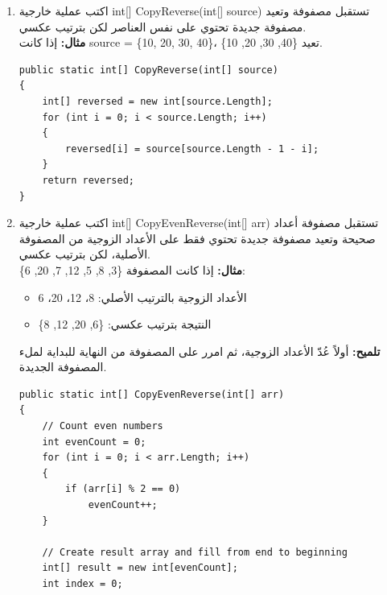 \documentclass[14pt]{extarticle}
\begin{document}
\begin{enumerate}[resume, itemsep=2em]
    \item
    اكتب عملية خارجية \textenglish{int[] CopyReverse(int[] source)} تستقبل مصفوفة وتعيد مصفوفة جديدة تحتوي على نفس العناصر لكن بترتيب عكسي.\\
    \textbf{مثال:} إذا كانت \textenglish{source = \{10, 20, 30, 40\}}، تعيد \textenglish{\{40, 30, 20, 10\}}.
    \ifwithsols
    \begin{boxSolution}
    \begin{english}
    \begin{verbatim}
public static int[] CopyReverse(int[] source)
{
    int[] reversed = new int[source.Length];
    for (int i = 0; i < source.Length; i++)
    {
        reversed[i] = source[source.Length - 1 - i];
    }
    return reversed;
}
    \end{verbatim}
    \end{english}
    \end{boxSolution}
    \fi

    \item
    اكتب عملية خارجية \textenglish{int[] CopyEvenReverse(int[] arr)} تستقبل مصفوفة أعداد صحيحة وتعيد مصفوفة جديدة تحتوي فقط على الأعداد الزوجية من المصفوفة الأصلية، لكن بترتيب عكسي.\\
    \textbf{مثال:} إذا كانت المصفوفة \textenglish{\{3, 8, 5, 12, 7, 20, 6\}}:
    \begin{itemize}
        \item الأعداد الزوجية بالترتيب الأصلي: 8، 12، 20، 6
        \item النتيجة بترتيب عكسي: \textenglish{\{6, 20, 12, 8\}}
    \end{itemize}
    \textbf{تلميح:} أولاً عُدّ الأعداد الزوجية، ثم امرر على المصفوفة من النهاية للبداية لملء المصفوفة الجديدة.
    \ifwithsols
    \begin{boxSolution}
    \begin{english}
    \begin{verbatim}
public static int[] CopyEvenReverse(int[] arr)
{
    // Count even numbers
    int evenCount = 0;
    for (int i = 0; i < arr.Length; i++)
    {
        if (arr[i] % 2 == 0)
            evenCount++;
    }

    // Create result array and fill from end to beginning
    int[] result = new int[evenCount];
    int index = 0;


\end{verbatim}
\end{english}
\end{boxSolution}
\end{enumerate}
\end{document}
